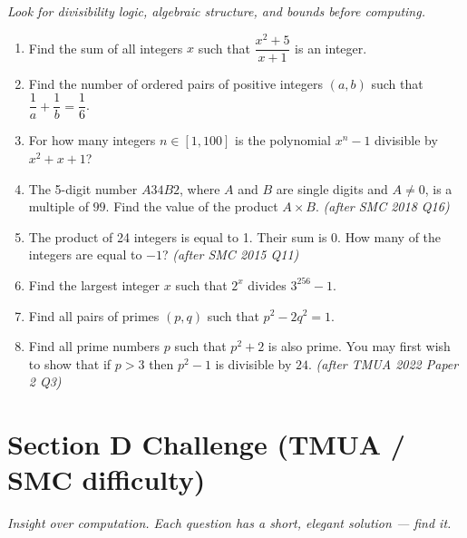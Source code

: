 \documentclass[11pt,a4paper]{article}
\begin{document}
\noindent\textit{Look for divisibility logic, algebraic structure, and bounds before computing.}

\begin{enumerate}

\item Find the sum of all integers $x$ such that $\dfrac{x^2 + 5}{x+1}$ is an integer.

\item Find the number of ordered pairs of positive integers $(a,b)$ such that $\dfrac{1}{a} + \dfrac{1}{b} = \dfrac{1}{6}$.

\item For how many integers $n \in [1, 100]$ is the polynomial $x^n - 1$ divisible by $x^2 + x + 1$?

\item The 5-digit number $A34B2$, where $A$ and $B$ are single digits and $A \neq 0$, is a multiple of $99$. Find the value of the product $A \times B$. \textit{\small(after SMC 2018 Q16)}

\item The product of 24 integers is equal to 1. Their sum is $0$. How many of the integers are equal to $-1$? \textit{\small(after SMC 2015 Q11)}

\item Find the largest integer $x$ such that $2^x$ divides $3^{256} - 1$.

\item Find all pairs of primes $(p,q)$ such that $p^2 - 2q^2 = 1$.

\item Find all prime numbers $p$ such that $p^2+2$ is also prime. You may first wish to show that if $p>3$ then $p^2-1$ is divisible by $24$. \textit{\small(after TMUA 2022 Paper 2 Q3)}

\end{enumerate}

\section*{Section D \quad Challenge \hfill{\normalfont\small(TMUA / SMC difficulty)}}

\noindent\textit{Insight over computation. Each question has a short, elegant solution --- find it.}
\end{document}
